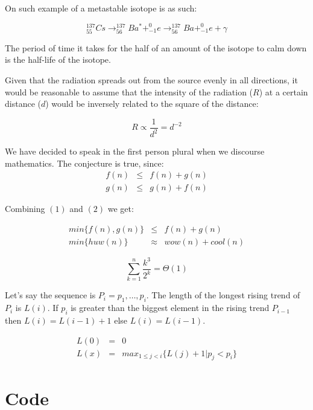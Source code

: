 \documentclass[11pt]{article}
\begin{document}
On such example of a metastable isotope is as such:

\begin{displaymath}
^{137}_{55}Cs \longrightarrow ^{137}_{56}Ba^{\ast} + ^{0}_{-1}e \longrightarrow ^{137}_{56}Ba + ^{0}_{-1}e + \gamma
\end{displaymath}

The period of time it takes for the half of an amount of the isotope to calm down is the half-life of the isotope.

Given that the radiation spreads out from the source evenly in all directions, it would be reasonable to assume that the intensity of the radiation ($R$) at a certain distance ($d$) would be inversely related to the square of the distance:

\begin{displaymath}
	R \propto \frac{1}{d^{2}} = d^{-2}
\end{displaymath}

We have decided to speak in the first person plural when we discourse mathematics. The conjecture is true, since:
\begin{eqnarray}
	f(n) &\leq& f(n) + g(n) \\
	g(n) &\leq& g(n) + f(n)
\end{eqnarray}

Combining $(1)$ and $(2)$ we get:

\begin{eqnarray*}
	min\{f(n), g(n)\} &\leq& f(n) + g(n) \\
    min\{huw(n)\} &\approx& wow(n) + cool(n)
\end{eqnarray*}



	\begin{equation*}
		\sum_{k=1}^{n} \frac{k^{3}}{2^{k}} = \Theta(1)
	\end{equation*}

Let's say the sequence is $P_{i} = p_1, \ldots, p_i$. The length of the longest rising trend of $P_i$ is $L(i)$. If $p_i$ is greater than the biggest element in the rising trend $P_{i-1}$ then $L(i) = L(i-1) + 1$ else $L(i) = L(i-1)$.

\begin{eqnarray*}
L(0) &=& 0 \\
L(x) &=& max_{1 \leq j < i}\{L(j) + 1 | p_{j} < p_{i}\}
\end{eqnarray*}


\section{Code}
\end{document}
